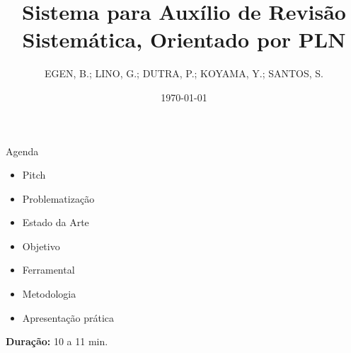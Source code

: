 \documentclass[aspectratio=169]{beamer}
\title{Sistema para Auxílio de Revisão Sistemática, Orientado por PLN}
\subtitle{}
\author[DSM]{EGEN, B.; LINO, G.; DUTRA, P.; KOYAMA, Y.; SANTOS, S.}
\institute{Desenvolvimento de Software Multiplataforma\\FATEC Registro}
\date{\today}
\begin{document}
\begin{frame}
  \vspace{0.8cm}
  \begin{center}
    
    \vspace{0.4cm}
    
    {\normalsize\bfseries\inserttitle}\par
    
    \vspace{0.2cm}
    
    {\tiny\insertauthor}\par
    
    \vspace{0.1cm}
    
    {\small\textcolor{azulComplementar}{\insertsubtitle}}\par
    
    \vspace{0.5cm}
    
    
    \vspace{0.3cm}
    
    {\scriptsize\insertinstitute}\par
    
    \vspace{0.01cm}
    
    {\tiny\textcolor{azulComplementar}{\insertdate}}\par
  \end{center}
\end{frame}

\begin{frame}[b]{Agenda}
  \begin{itemize}
    \item Pitch
    \item Problematização
    \item Estado da Arte
    \item Objetivo
    \item Ferramental
    \item Metodologia
    \item Apresentação prática
  \end{itemize}
  
  \vfill
  
  \hfill{\scriptsize \textbf{Duração:} 10 a 11 min.}
\end{frame}
\end{document}
